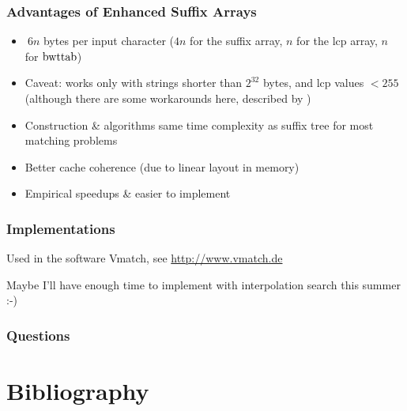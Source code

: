 \documentclass[compress,handout]{beamer} %
\begin{document}
\begin{frame}
	\frametitle{Advantages of Enhanced Suffix Arrays}
	\begin{itemize}
		\item $~6n$ bytes per input character ($4n$ for the suffix array, $n$ for the lcp array, $n$ for $\hbox{bwttab}$)
		\item Caveat: works only with strings shorter than $2^{32}$ bytes, and lcp values $<255$ (although there are some workarounds here, described by \citealt{abouelhoda2004replacing})
		\item Construction \& algorithms same time complexity as suffix tree for most matching problems
		\item Better cache coherence (due to linear layout in memory)
		\item Empirical speedups \& easier to implement
	\end{itemize}
\end{frame}

\begin{frame}
	\frametitle{Implementations}
	Used in the software Vmatch, see \href{http://www.vmatch.de}{http://www.vmatch.de}

	\vspace{1cm}

	Maybe I'll have enough time to implement with interpolation
	search this summer :-)
\end{frame}

\begin{frame}
	\frametitle{Questions}

	\Huge{\textinterrobang}
\end{frame}

\section{Bibliography}



\end{document}
